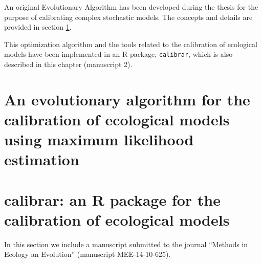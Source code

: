 An original Evolutionary Algorithm has been developed during the thesis for the purpose of calibrating complex stochastic models. The concepts and details are provided in section \ref{AHR-ES}.

This optimization algorithm and the tools related to the calibration of ecological models have been implemented in an R package, \texttt{calibrar}, which is also described in this chapter (manuscript 2).


\section[An evolutionary algorithm for the calibration of ecological models]{An evolutionary algorithm for the calibration of ecological models using maximum likelihood estimation}
\label{AHR-ES}



\section{calibrar: an R package for the calibration of ecological models}
\label{calibrar}

In this section we include a manuscript submitted to the journal ``Methods in Ecology an Evolution'' (manuscript MEE-14-10-625).

